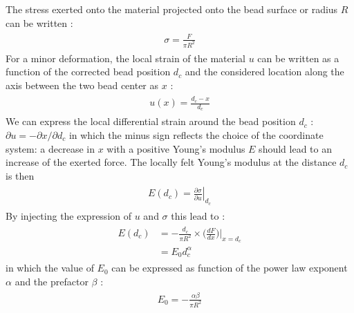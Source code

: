 \documentclass[A4paperpaper,11pt,english]{sphinxmanual}
\begin{document}
The stress exerted onto the material projected onto the bead surface or radius
\(R\) can be written :
\label{index-latex:equation-eqa32}\begin{gather}
\begin{split}\sigma = \frac{F}{\pi R^2}\end{split}\label{index-latex-eqa32}
\end{gather}
For a minor deformation, the local strain of the material \(u\) can be written
as a function of the corrected bead position \(d_c\) and the considered location
along the axis between the two bead center as \(x\) :
\label{index-latex:equation-eqa33}\begin{gather}
\begin{split}u(x)= \frac{d_c-x}{d_c}\end{split}\label{index-latex-eqa33}
\end{gather}
We can express the local differential strain around the bead position \(d_c\) : \(\partial u = -\partial x/ \partial d_c\) in which the minus sign
reflects the choice of the coordinate system: a decrease in \(x\) with a
positive Young's modulus \(E\) should lead to an increase of the exerted force.
The locally felt Young's modulus
at the distance \(d_c\) is then
\label{index-latex:eq-e}\label{index-latex:equation-eqa34}\begin{gather}
\begin{split}E(d_c) = \left.\frac{\partial\sigma}{\partial u}\right|_{d_c}\end{split}\label{index-latex-eqa34}
\end{gather}
By injecting the expression of \(u\) and \(\sigma\) this lead to :
\label{index-latex:equation-eqa35}\begin{gather}
\begin{split}E(d_c) &= -\frac{d_c}{\pi R^2}\times \Big(\frac{dF}{dx}\Big) \Big|_{x=d_c}\\
     &= E_0 d_c^\alpha\end{split}\label{index-latex-eqa35}
\end{gather}
in which the value of \(E_0\) can be expressed as function of the power law exponent \(\alpha\) and the prefactor \(\beta\) :
\label{index-latex:equation-eqa36}\begin{gather}
\begin{split}E_0 = - \frac{\alpha\beta}{\pi R^2}\end{split}\label{index-latex-eqa36}
\end{gather}
\end{document}
